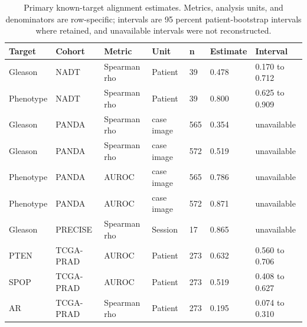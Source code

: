 \begin{table}[H]
\centering
\scriptsize
\caption{Primary known-target alignment estimates. Metrics, analysis units, and denominators are row-specific; intervals are 95 percent patient-bootstrap intervals where retained, and unavailable intervals were not reconstructed.}
\label{tab:supp-primary-estimates}
\begin{tabular}{@{}p{}p{}p{}p{}p{}p{}p{}@{}}
\toprule
Target & Cohort & Metric & Unit & n & Estimate & Interval \\
\midrule
Gleason & NADT & Spearman rho & Patient & 39 & 0.478 & 0.170 to 0.712 \\
Phenotype & NADT & Spearman rho & Patient & 39 & 0.800 & 0.625 to 0.909 \\
Gleason & PANDA & Spearman rho & case image & 565 & 0.354 & unavailable \\
Gleason & PANDA & Spearman rho & case image & 572 & 0.519 & unavailable \\
Phenotype & PANDA & AUROC & case image & 565 & 0.786 & unavailable \\
Phenotype & PANDA & AUROC & case image & 572 & 0.871 & unavailable \\
Gleason & PRECISE & Spearman rho & Session & 17 & 0.865 & unavailable \\
PTEN & TCGA-PRAD & AUROC & Patient & 273 & 0.632 & 0.560 to 0.706 \\
SPOP & TCGA-PRAD & AUROC & Patient & 273 & 0.519 & 0.408 to 0.627 \\
AR & TCGA-PRAD & Spearman rho & Patient & 273 & 0.195 & 0.074 to 0.310 \\
\bottomrule
\end{tabular}
\end{table}

